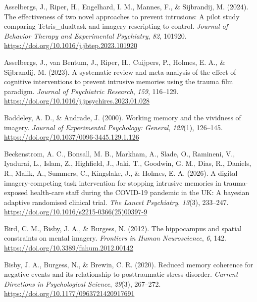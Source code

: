 \documentclass[
  man,
  floatsintext,
  longtable,
  nolmodern,
  notxfonts,
  notimes,
  draftfirst,
  colorlinks=true,linkcolor=blue,citecolor=blue,urlcolor=blue]{apa7}
\newlength{\cslhangindent}
\newenvironment{CSLReferences}[2] %
 {\begin{list}{}{%
  \setlength{\itemindent}{0pt}
  \setlength{\leftmargin}{0pt}
  \setlength{\parsep}{0pt}
  \ifodd #1
   \setlength{\leftmargin}{\cslhangindent}
   \setlength{\itemindent}{-1\cslhangindent}
  \fi
  \setlength{\itemsep}{#2\baselineskip}}}
 {\end{list}}
\begin{document}
\label{refs}
\begin{CSLReferences}{1}{0}
Asselbergs, J., Riper, H., Engelhard, I. M., Mannes, F., \& Sijbrandij,
M. (2024). The effectiveness of two novel approaches to prevent
intrusions: A pilot study comparing {Tetris}\_dualtask and imagery
rescripting to control. \emph{Journal of Behavior Therapy and
Experimental Psychiatry}, \emph{82}, 101920.
\url{https://doi.org/10.1016/j.jbtep.2023.101920}

Asselbergs, J., van Bentum, J., Riper, H., Cuijpers, P., Holmes, E. A.,
\& Sijbrandij, M. (2023). A systematic review and meta-analysis of the
effect of cognitive interventions to prevent intrusive memories using
the trauma film paradigm. \emph{Journal of Psychiatric Research},
\emph{159}, 116--129.
\url{https://doi.org/10.1016/j.jpsychires.2023.01.028}

Baddeley, A. D., \& Andrade, J. (2000). Working memory and the vividness
of imagery. \emph{Journal of Experimental Psychology: General},
\emph{129}(1), 126--145.
\url{https://doi.org/10.1037/0096-3445.129.1.126}

Beckenstrom, A. C., Bonsall, M. B., Markham, A., Slade, O., Ramineni,
V., Iyadurai, L., Islam, Z., Highfield, J., Jaki, T., Goodwin, G. M.,
Dias, R., Daniels, R., Malik, A., Summers, C., Kingslake, J., \& Holmes,
E. A. (2026). A digital imagery-competing task intervention for stopping
intrusive memories in trauma-exposed health-care staff during the
{COVID-19} pandemic in the {UK}: A bayesian adaptive randomised clinical
trial. \emph{The Lancet Psychiatry}, \emph{13}(3), 233--247.
\url{https://doi.org/10.1016/s2215-0366(25)00397-9}

Bird, C. M., Bisby, J. A., \& Burgess, N. (2012). The hippocampus and
spatial constraints on mental imagery. \emph{Frontiers in Human
Neuroscience}, \emph{6}, 142.
\url{https://doi.org/10.3389/fnhum.2012.00142}

Bisby, J. A., Burgess, N., \& Brewin, C. R. (2020). Reduced memory
coherence for negative events and its relationship to posttraumatic
stress disorder. \emph{Current Directions in Psychological Science},
\emph{29}(3), 267--272. \url{https://doi.org/10.1177/0963721420917691}


\end{CSLReferences}
\end{document}
